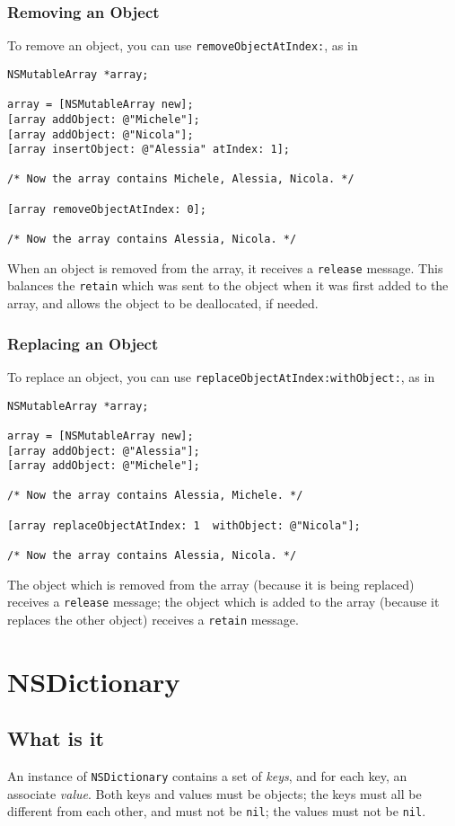 \documentclass[a4paper]{article}
\begin{document}
\subsubsection{Removing an Object}
To remove an object, you can use \texttt{removeObjectAtIndex:}, as in 
\begin{verbatim}
NSMutableArray *array;

array = [NSMutableArray new];
[array addObject: @"Michele"];
[array addObject: @"Nicola"];
[array insertObject: @"Alessia" atIndex: 1];

/* Now the array contains Michele, Alessia, Nicola. */

[array removeObjectAtIndex: 0];

/* Now the array contains Alessia, Nicola. */
\end{verbatim}
When an object is removed from the array, it receives a \texttt{release} 
message.  This balances the \texttt{retain} which was sent to the object 
when it was first added to the array, and allows the object to be 
deallocated, if needed.

\subsubsection{Replacing an Object}
To replace an object, you can use
\texttt{replaceObjectAtIndex:withObject:}, as in
\begin{verbatim}
NSMutableArray *array;

array = [NSMutableArray new];
[array addObject: @"Alessia"];
[array addObject: @"Michele"];

/* Now the array contains Alessia, Michele. */

[array replaceObjectAtIndex: 1  withObject: @"Nicola"];

/* Now the array contains Alessia, Nicola. */
\end{verbatim}
The object which is removed from the array (because it is being
replaced) receives a \texttt{release} message; the object which is
added to the array (because it replaces the other object) receives a
\texttt{retain} message.

\section{NSDictionary}
\subsection{What is it}
An instance of \texttt{NSDictionary} contains a set of \emph{keys}, and 
for each key, an associate \emph{value}.  Both keys and values must 
be objects; the keys must all be different from each other, and must 
not be \texttt{nil}; the values must not be \texttt{nil}.
\end{document}
